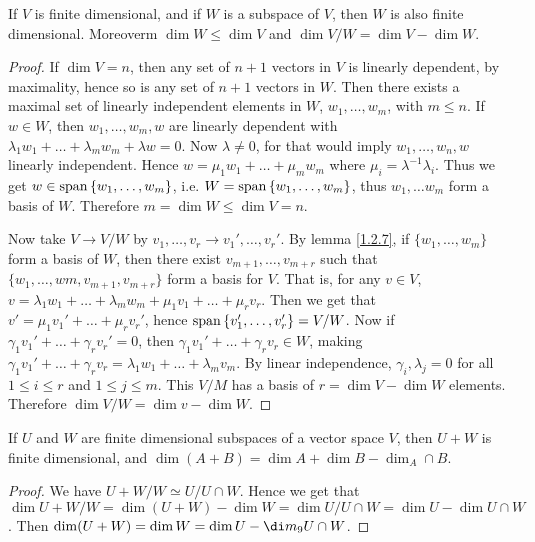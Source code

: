 \begin{lemma}
    If $V$ is finite dimensional, and if  $W$ is a subspace of  $V$, then  $W$
    is also finite dimensional. Moreoverm  $\dim{W} \leq \dim{V}$ and
    $\dim{V/W}=\dim{V}-\dim{W}$.
\end{lemma}
\begin{proof}
    If $\dim{V}=n$, then any set of $n+1$ vectors in $V$ is linearly dependent, by
    maximality, hence so is any  set of $n+1$ vectors in  $W$. Then there
    exists a maximal set of linearly independent elements in $W$,  $ w_1, \dots,
    w_m$, with $m \leq n$. If  $w \in W$, then  $ w_1, \dots, w_m,w$ are
    linearly dependent with $\lambda_1w_1+\dots+\lambda_mw_m+\lambda w=0$. Now
    $\lambda \neq 0$, for that would imply $ w_1, \dots, w_n, w$ linearly
    independent. Hence $w=\mu_1w_1+\dots+\mu_mw_m$ where
    $\mu_i=\lambda^{-1}\lambda_i$. Thus we get $w \in \operatorname{span}{\{w_1, \dots,
    w_m\}}$, i.e. $W=\operatorname{span}{\{w_1, \dots, w_m\}}$, thus $ w_1, \dots w_m$ form a
    basis of $W$. Therefore  $m=\dim{W} \leq \dim{V}=n$.

    Now take $V \rightarrow V/W$ by $ v_1, \dots, v_r \rightarrow v_1', \dots,
    v_r'$. By lemma \ref{1.2.7}, if $\{w_1, \dots, w_m\}$ form a basis of $W$,
    then there exist  $v_{m+1}, \dots, v_{m+r}$ such that $\{w_1, \dots,
    wm,v_{m+1}, v_{m+r}\}$ form a basis for $V$. That is, for any  $v \in V$,
    $v=\lambda_1w_1+\dots+\lambda_mw_m+\mu_1v_1+\dots+\mu_rv_r$. Then we get
    that $v'=\mu_1v_1'+\dots+\mu_rv_r'$, hence $\operatorname{span}{\{v_1', \dots,
    v_r'\}}=V/W$. Now if $\gamma_1v_1'+\dots+\gamma_rv_r'=0$, then
    $\gamma_1v_1'+\dots+\gamma_rv_r \in W$, making
    $\gamma_1v_1'+\dots+\gamma_rv_r=\lambda_1w_1+\dots+\lambda_mv_m$. By linear
    independence, $\gamma_i, \lambda_j=0$ for all  $1 \leq i \leq r$ and  $1
    \leq j \leq m$. This  $V/M$ has a basis of $r=\dim{V}-\dim{W}$ elements.
    Therefore $\dim{V/W}=\dim{v}-\dim{W}$.
\end{proof}
\begin{corollary}
    If $U$ and  $W$ are finite dimensional subspaces of a vector space  $V$,
    then  $U+W$ is finite dimensional, and  $\dim(A+B)=\dim{A}+\dim{B}-\dim_A
    \cap B$.
\end{corollary}
\begin{proof}
    We have $U+W/W \simeq U/U \cap W$. Hence we get that
    $\dim{U+W/W}=\dim{(U+W)}-\dim{W}=\dim{U/U \cap W}=\dim{U}-\dim{U \cap W}$.
    Then $\dim(U+W)=\dim{W}=\dim{U}-\di m_9U \cap W$.
\end{proof}
